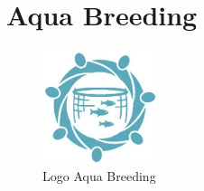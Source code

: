 		


		



\section{Aqua Breeding}

\begin{figure}[H]
	\centering
	\includegraphics[width=0.3\textwidth]{gambar/logo_aquabreeding.jpeg}
	\caption{Logo Aqua Breeding}
\end{figure}

